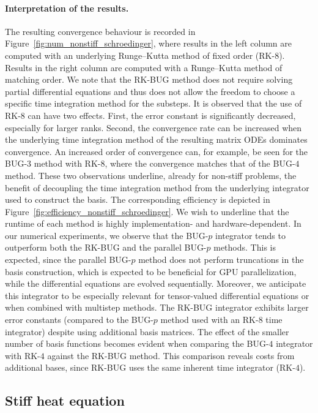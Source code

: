\documentclass[preprint,runningheads]{svjour3}
\begin{document}
\paragraph{Interpretation of the results.}
 {The resulting convergence behaviour is recorded in Figure~\ref{fig:num_nonstiff_schroedinger}, where results in the left column are computed with an underlying Runge--Kutta method of fixed order (RK-$8$). Results in the right column are computed with a Runge--Kutta method of matching order. We note that the RK-BUG method does not require solving partial differential equations and thus does not allow the freedom to choose a specific time integration method for the substeps. It is observed that the use of RK-$8$ can have two effects. First, the error constant is significantly decreased, especially for larger ranks. Second, the convergence rate can be increased when the underlying time integration method of the resulting matrix ODEs dominates convergence. An increased order of convergence can, for example, be seen for the BUG-$3$ method with RK-$8$, where the convergence matches that of the BUG-$4$ method. These two observations underline, already for non-stiff problems, the benefit of decoupling the time integration method from the underlying integrator used to construct the basis. The corresponding efficiency is depicted in Figure~\ref{fig:efficiency_nonstiff_schroedinger}. We wish to underline that the runtime of each method is highly implementation- and hardware-dependent. In our numerical experiments, we observe that the BUG-$p$ integrator tends to outperform both the RK-BUG and the parallel BUG-$p$ methods. This is expected, since the parallel BUG-$p$ method does not perform truncations in the basis construction, which is expected to be beneficial for GPU parallelization, while the differential equations are evolved sequentially. Moreover, we anticipate this integrator to be especially relevant for tensor-valued differential equations or when combined with multistep methods. The RK-BUG integrator exhibits larger error constants (compared to the BUG-$p$ method used with an RK-$8$ time integrator) despite using additional basis matrices. The effect of the smaller number of basis functions becomes evident when comparing the BUG-$4$ integrator with RK-$4$ against the RK-BUG method. This comparison reveals costs from additional bases, since RK-BUG uses the same inherent time integrator (RK-$4$).}

\subsection{Stiff heat equation}
\label{sec:num_stiff_heat}
\end{document}
